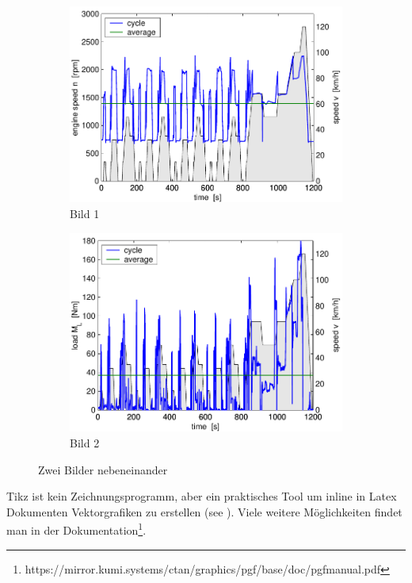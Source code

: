 \begin{figure}[hbp]
  \begin{subfigure}[t]{0.48\textwidth}
    \includegraphics[width = \textwidth]{images/cycle_we.pdf}
    \caption{Bild 1}
    \label{pics:cycle:1}
  \end{subfigure}
  \hfill
  \begin{subfigure}[t]{0.48\textwidth}
    \includegraphics[width = \textwidth]{images/cycle_ml.pdf}
    \caption{Bild 2}
    \label{pics:cycle:2}
  \end{subfigure}
  \caption{Zwei Bilder nebeneinander}
  \label{pics:cycle}
\end{figure}

Tikz ist kein Zeichnungsprogramm, aber ein praktisches Tool um inline 
in Latex Dokumenten Vektorgrafiken zu erstellen (see ). 
Viele weitere Möglichkeiten findet man in der 
Dokumentation\footnote{https://mirror.kumi.systems/ctan/graphics/pgf/base/doc/pgfmanual.pdf}.

